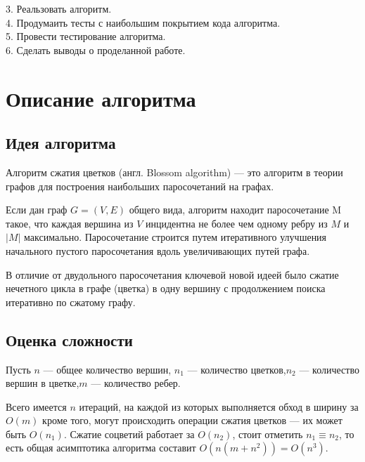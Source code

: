 \documentclass[14pt, a4paper]{extarticle}
\begin{document}
    3. Реальзовать алгоритм.\\

    4. Продумаить тесты с наибольшим покрытием кода алгоритма.\\

    5. Провести тестирование алгоритма.\\

    6. Сделать выводы о проделанной работе.\\

    \pagebreak
    
    \section*{Описание алгоритма}

    \subsection*{Идея алгоритма}
    
    Алгоритм сжатия цветков (англ. Blossom algorithm) — это алгоритм в теории графов для построения наибольших паросочетаний на графах.
    
    Если дан граф $G=(V, E)$ общего вида, алгоритм находит паросочетание M такое, что каждая вершина из $V$ инцидентна не более чем одному ребру из $M$ и $|M|$ максимально. Паросочетание строится путем итеративного улучшения начального пустого паросочетания вдоль увеличивающих путей графа. 
    
    В отличие от двудольного паросочетания ключевой новой идеей было сжатие нечетного цикла в графе (цветка) в одну вершину с продолжением поиска итеративно по сжатому графу.

    \subsection*{Оценка сложности}
    
    Пусть $n$ --- общее количество вершин, $n_1$ --- количество цветков,$n_2$ --- количество вершин в цветке,$m$ --- количество ребер. 

    Всего имеется $n$ итераций, на каждой из которых выполняется обход в ширину за $O(m)$ кроме того, могут происходить операции сжатия цветков — их может быть $O(n_1)$. Сжатие соцветий работает за $O(n_2)$, стоит отметить $n_1 \equiv n_2$, то есть общая асимптотика алгоритма составит $O(n(m+n^2))=O(n^3)$.
\end{document}
